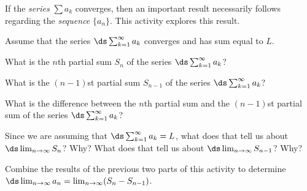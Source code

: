 \begin{activity} \label{8.3.Act2} If the \emph{series} $\sum a_k$ converges, then an important result necessarily follows regarding the \emph{sequence} $\{a_n\}$. This activity explores this result. 

Assume that the series $\ds \sum_{k=1}^{\infty} a_k$ 
converges and has sum equal to $L$. 

\ba
\item What is the $n$th partial sum $S_n$ of the series $\ds \sum_{k=1}^{\infty} a_k$?

\item What is the $(n-1)$st partial sum $S_{n-1}$ of the series $\ds \sum_{k=1}^{\infty} a_k$?

\item What is the difference between the $n$th partial sum and the $(n-1)$st partial sum of the series $\ds \sum_{k=1}^{\infty} a_k$?

\item Since we are assuming that  $\ds \sum_{k=1}^{\infty} a_k = L$, what does that tell us about $\ds \lim_{n \to \infty} S_n$? Why?  What does that tell us about $\ds \lim_{n \to \infty} S_{n-1}$? Why?



\item Combine the results of the previous two parts of this activity to determine $\ds \lim_{n \to \infty} a_n = \lim_{n \to \infty} (S_n - S_{n-1})$.


\ea

\end{activity}

